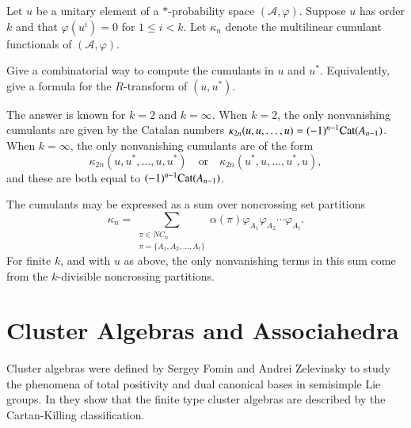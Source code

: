 \documentclass[12pt,letterpaper, reqno]{aimpl}
\newcommand{\Cat}{{\rm Cat}}
\newcommand{\A}{\mathcal A}
\begin{document}
\begin{problemblock}
\begin{problem}[5.3] \label{prob:kdivisible} Let $u$ be a unitary element of a $*$-probability space $(\A,\varphi)$. Suppose $u$ has order $k$ and that $\varphi(u^i)=0$ for $1\leq i< k$. Let $\kappa_n$ denote the multilinear cumulant functionals of $(\A,\varphi)$.

Give a combinatorial way to compute the cumulants in $u$ and $u^*$. Equivalently, give a formula for the $R$-transform of $(u,u^*)$.
\end{problem}

\begin{remark} The answer is known for $k=2$ and $k=\infty$. When $k=2$, the only nonvanishing cumulants are given by the Catalan numbers $\kappa_{2n}(u,u,\ldots,u)=(-1)^{n-1} \Cat(A_{n-1})$. When $k=\infty$, the only nonvanishing cumulants are of the form
\begin{equation*}
\kappa_{2n}(u,u^*,\ldots,u,u^*)\quad\text{or}\quad \kappa_{2n}(u^*,u,\ldots,u^*,u),
\end{equation*}
 and these are both equal to $(-1)^{n-1}\Cat(A_{n-1})$.
\end{remark}
\begin{remark} The cumulants may be expressed as a sum over noncrossing set partitions
\begin{equation*}
\kappa_n = \sum_{\substack{\pi\in NC_n\\ \pi=\{A_1,A_2,\ldots,A_t\}}} \alpha(\pi) \varphi_{A_1}\varphi_{A_2}\cdots \varphi_{A_t}.
\end{equation*}
For finite $k$, and with $u$ as above, the only nonvanishing terms in this sum come from the $k$-divisible noncrossing partitions.
\end{remark}

\end{problemblock}

\section{Cluster Algebras and Associahedra}
\label{sec:cluster}
Cluster algebras were defined by Sergey Fomin and Andrei Zelevinsky to study the phenomena of total positivity and dual canonical bases in semisimple Lie groups. In \cite{fomin-zelevinsky:finitetype} they show that the finite type cluster algebras are described by the Cartan-Killing classification.
\end{document}
